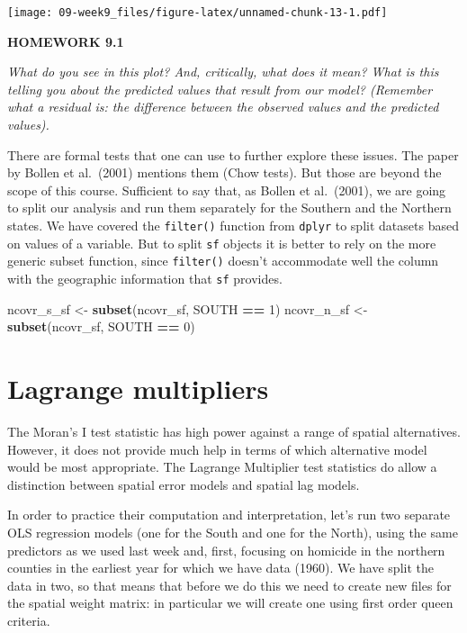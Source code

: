 \documentclass[]{book}
\newenvironment{Shaded}{\begin{snugshade}}{\end{snugshade}}
\newcommand{\DecValTok}[1]{\textcolor[rgb]{0.00,0.00,0.81}{#1}}
\newcommand{\KeywordTok}[1]{\textcolor[rgb]{0.13,0.29,0.53}{\textbf{#1}}}
\newcommand{\NormalTok}[1]{#1}
\newcommand{\OperatorTok}[1]{\textcolor[rgb]{0.81,0.36,0.00}{\textbf{#1}}}
\newcommand{\StringTok}[1]{\textcolor[rgb]{0.31,0.60,0.02}{#1}}
\begin{document}
\texttt{[image: 09-week9\_files/figure-latex/unnamed-chunk-13-1.pdf]}

\textbf{HOMEWORK 9.1}

\emph{What do you see in this plot? And, critically, what does it mean? What is this telling you about the predicted values that result from our model? (Remember what a residual is: the difference between the observed values and the predicted values).}

There are formal tests that one can use to further explore these issues. The paper by Bollen et al.~(2001) mentions them (Chow tests). But those are beyond the scope of this course. Sufficient to say that, as Bollen et al.~(2001), we are going to split our analysis and run them separately for the Southern and the Northern states. We have covered the \texttt{filter()} function from \texttt{dplyr} to split datasets based on values of a variable. But to split \texttt{sf} objects it is better to rely on the more generic subset function, since \texttt{filter()} doesn't accommodate well the column with the geographic information that \texttt{sf} provides.

\begin{Shaded}
\begin{Highlighting}[]
\NormalTok{ncovr_s_sf <-}\StringTok{ }\KeywordTok{subset}\NormalTok{(ncovr_sf, SOUTH }\OperatorTok{==}\StringTok{ }\DecValTok{1}\NormalTok{)}
\NormalTok{ncovr_n_sf <-}\StringTok{ }\KeywordTok{subset}\NormalTok{(ncovr_sf, SOUTH }\OperatorTok{==}\StringTok{ }\DecValTok{0}\NormalTok{)}
\end{Highlighting}
\end{Shaded}

\hypertarget{lagrange-multipliers}{%
\section{Lagrange multipliers}\label{lagrange-multipliers}}

The Moran's I test statistic has high power against a range of spatial alternatives. However, it does not provide much help in terms of which alternative model would be most appropriate. The Lagrange Multiplier test statistics do allow a distinction between spatial error models and spatial lag models.

In order to practice their computation and interpretation, let's run two separate OLS regression models (one for the South and one for the North), using the same predictors as we used last week and, first, focusing on homicide in the northern counties in the earliest year for which we have data (1960). We have split the data in two, so that means that before we do this we need to create new files for the spatial weight matrix: in particular we will create one using first order queen criteria.
\end{document}
